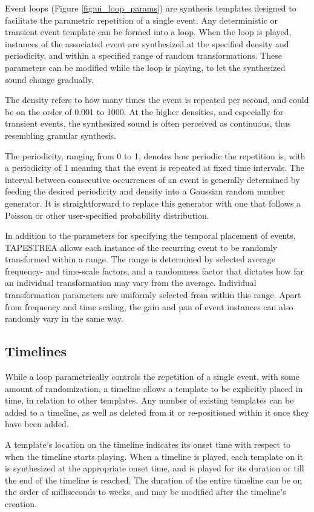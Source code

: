 \documentclass[10pt,letterpaper]{article}
\begin{document}
Event loops (Figure \ref{fig:ui_loop_params}) are synthesis templates designed to facilitate the
parametric repetition of a single event. Any deterministic or transient
event template can be formed into a loop. When the loop is played,
instances of the associated event are synthesized at the specified
density and periodicity, and within a specified range of random
transformations. These parameters can be modified while the loop is
playing, to let the synthesized sound change gradually. 

The density refers to how many times the event is repeated per second,
and could be on the order of 0.001 to 1000. At the higher densities, and
especially for transient events, the synthesized sound is often
perceived as continuous, thus resembling granular synthesis. 

The periodicity, ranging from 0 to 1, denotes how periodic the
repetition is, with a periodicity of 1 meaning that the event is
repeated at fixed time intervals. The interval between consecutive
occurrences of an event is generally determined by feeding the desired
periodicity and density into a Gaussian random number generator. It is
straightforward to replace this generator with one that follows a
Poisson or other user-specified probability distribution. 

In addition to the parameters for specifying the temporal placement of
events, TAPESTREA allows each instance of the recurring event to be
randomly transformed within a range. The range is determined by selected
average frequency- and time-scale factors, and a randomness factor that
dictates how far an individual transformation may vary from the average.
Individual transformation parameters are uniformly selected from within
this range. Apart from frequency and time scaling, the gain and pan of
event instances can also randomly vary in the same way.

\subsection{Timelines}

While a loop parametrically controls the repetition of a single event,
with some amount of randomization, a timeline allows a template to be
explicitly placed in time, in relation to other templates. Any number of
existing templates can be added to a timeline, as well as deleted from
it or re-positioned within it once they have been added. 

A template's location on the timeline indicates its onset time with
respect to when the timeline starts playing. When a timeline is played,
each template on it is synthesized at the appropriate onset time, and is
played for its duration or till the end of the timeline is reached. The
duration of the entire timeline can be on the order of milliseconds to
weeks, and may be modified after the timeline's creation. 
\end{document}

